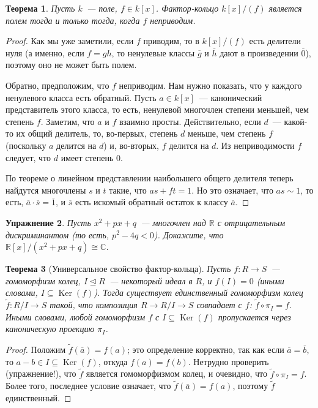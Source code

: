 \documentclass[a4paper,11pt]{scrartcl}
\theoremstyle{plain}
\newtheorem{theorem}{Теорема}[subsection]
\newtheorem{exercise}[theorem]{Упражнение}
\theoremstyle{definition}
\newcommand\trleq{\trianglelefteq}
\newcommand\isom{\cong}
\newcommand\wt{\widetilde}
\newcommand\sseq{\subseteq}
\newcommand\Ker{\operatorname{Ker}}
\begin{document}
\begin{theorem}
Пусть $k$~--- поле, $f\in k[x]$. Фактор-кольцо $k[x]/(f)$ является
полем тогда и только тогда, когда $f$ неприводим.
\end{theorem}
\begin{proof}
Как мы уже заметили, если $f$ приводим, то в $k[x]/(f)$ есть делители
нуля (а именно, если $f=gh$, то ненулевые классы $\overline{g}$ и
$\overline{h}$ дают в произведении $\overline{0}$), поэтому оно не
может быть полем.

Обратно, предположим, что $f$ неприводим. Нам нужно показать, что у
каждого ненулевого класса есть обратный. Пусть $a\in k[x]$~---
канонический представитель этого класса, то есть, ненулевой многочлен
степени меньшей, чем степень $f$. Заметим, что $a$ и $f$ взаимно
просты. Действительно, если $d$~--- какой-то их общий делитель, то,
во-первых, степень $d$ меньше, чем степень $f$ (поскольку $a$ делится
на $d$) и, во-вторых, $f$ делится на $d$. Из неприводимости $f$
следует, что $d$ имеет степень 0.

По теореме о линейном представлении наибольшего общего делителя
теперь найдутся многочлены $s$ и $t$ такие, что $as+ft=1$. Но это
означает, что $as\sim 1$, то есть,
$\overline{a}\cdot\overline{s}=\overline{1}$, и $\overline{s}$ есть
искомый обратный остаток к классу $\overline{a}$.
\end{proof}

\begin{exercise}
Пусть $x^2+px+q$~--- многочлен над $\mathbb R$ с отрицательным
дискриминантом (то есть, $p^2-4q<0$). Докажите, что $\mathbb
R[x]/(x^2+px+q)\isom\mathbb C$.
\end{exercise}

\begin{theorem}[Универсальное свойство фактор-кольца]\label{homo_factor}
Пусть $f\colon R\to S$~--- гомоморфизм колец, $I\trleq R$~---
некоторый идеал в $R$, и $f(I)=0$ (иными словами,
$I\sseq\Ker(f)$). Тогда существует единственный гомоморфизм колец
$\wt{f}\colon R/I\to S$ такой, что композиция $R\to R/I\to S$
совпадает с $f$: $\wt{f}\circ\pi_I=f$. Иными словами, любой
гомоморфизм $f$ с $I\sseq\Ker(f)$ пропускается через каноническую
проекцию $\pi_I$.
\end{theorem}
\begin{proof}
Положим $\wt{f}(\overline{a})=f(a)$; это определение корректно, так
как если $\overline{a}=\overline{b}$, то $a-b\in I\sseq\Ker(f)$,
откуда $f(a)=f(b)$. Нетрудно проверить (упражнение!),
что $\wt{f}$ является
гомоморфизмом колец, и очевидно, что $\wt{f}\circ\pi_I=f$. Более
того, последнее условие означает, что $\wt{f}(\overline{a})=f(a)$,
поэтому $\wt{f}$ единственный.
\end{proof}
\end{document}
